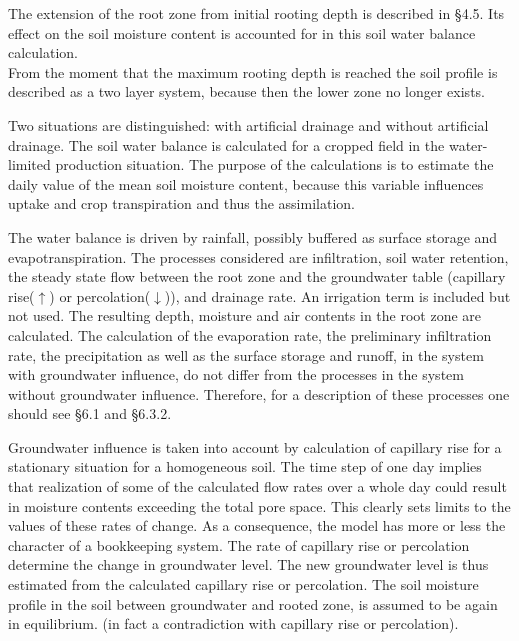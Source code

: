 The extension of the root zone from initial rooting depth is described in \S 4.5. Its effect
on the soil moisture content is accounted for in this soil water balance calculation.\\
From the moment that the maximum rooting depth is reached the soil profile is described
as a two layer system, because then the lower zone no longer exists.

Two situations are distinguished: with artificial drainage and without artificial drainage.
The soil water balance is calculated for a cropped field in the water-limited production
situation. The purpose of the calculations is to estimate the daily value of the mean soil
moisture content, because this variable influences uptake and crop transpiration and thus
the assimilation.

The water balance is driven by rainfall, possibly buffered as surface storage and
evapotranspiration. The processes considered are infiltration, soil water retention, the
steady state flow between the root zone and the groundwater table (capillary rise($\uparrow$) or
percolation($\downarrow$)), and drainage rate. An irrigation term is included but not used. The
resulting depth, moisture and air contents in the root zone are calculated. The calculation
of the evaporation rate, the preliminary infiltration rate, the precipitation as well as the
surface storage and runoff, in the system with groundwater influence, do not differ from
the processes in the system without groundwater influence. Therefore, for a description of
these processes one should see \S 6.1 and \S 6.3.2.

Groundwater influence is taken into account by calculation of capillary rise for a
stationary situation for a homogeneous soil. The time step of one day implies that
realization of some of the calculated flow rates over a whole day could result in moisture
contents exceeding the total pore space. This clearly sets limits to the values of these rates
of change. As a consequence, the model has more or less the character of a bookkeeping
system. The rate of capillary rise or percolation determine the change in groundwater
level. The new groundwater level is thus estimated from the calculated capillary rise or
percolation. The soil moisture profile in the soil between groundwater and rooted zone, is
assumed to be again in equilibrium. (in fact a contradiction with capillary rise or
percolation).

